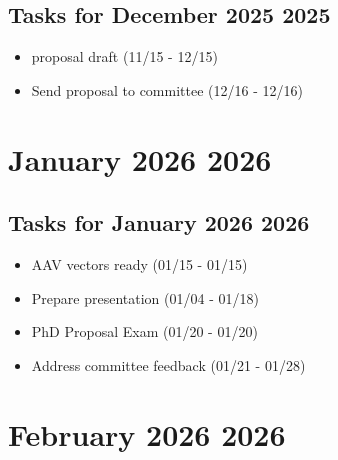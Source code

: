 \documentclass[landscape,a4paper]{article}
\begin{document}
\begin{center}
\begin{tikzpicture}[scale=0.9]
\end{tikzpicture}
\end{center}

\vspace{1cm}

\subsection*{Tasks for December 2025 2025}
\begin{itemize}
\item proposal draft (11/15 - 12/15)
\item Send proposal to committee (12/16 - 12/16)
\end{itemize}
\newpage

\section*{January 2026 2026}

\begin{center}
\begin{tikzpicture}[scale=0.9]
\end{tikzpicture}
\end{center}

\vspace{1cm}

\subsection*{Tasks for January 2026 2026}
\begin{itemize}
\item AAV vectors ready (01/15 - 01/15)
\item Prepare presentation (01/04 - 01/18)
\item PhD Proposal Exam (01/20 - 01/20)
\item Address committee feedback (01/21 - 01/28)
\end{itemize}
\newpage

\section*{February 2026 2026}
\end{document}

